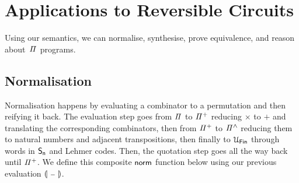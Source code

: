 \section{Applications to Reversible Circuits}
\label{sec:applications}

Using our semantics, we can normalise, synthesise, prove equivalence, and reason about~$\mathit{\Pi}$ programs.



\subsection{Normalisation}

Normalisation happens by evaluating a combinator to a permutation and then reifying it back. The evaluation step goes
from $\mathit{\Pi}$ to $\mathit{{\Pi}^{+}}$ reducing $\times$ to $+$ and translating the corresponding combinators, then from
$\mathit{{\Pi}^{+}}$ to $\mathit{{\Pi}^{\wedge}}$ reducing them to natural numbers and adjacent transpositions, then finally to $\UFin$
through words in $\Sn$ and Lehmer codes. Then, the quotation step goes all the way back until $\mathit{{\Pi}^{+}}$. We define
this composite $\normt$ function below using our previous evaluation $\llparenthesis~{\scriptstyle{-}}~\rrparenthesis$.


